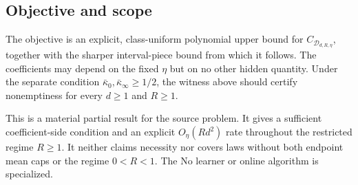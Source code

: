 \subsection{Objective and scope}

The objective is an explicit, class-uniform polynomial upper bound for
$C_{\mathcal D_{d,R,\eta}}$, together with the sharper interval-piece bound
from which it follows.  The coefficients may depend on the fixed $\eta$ but
on no other hidden quantity.  Under the separate condition
$\bar\kappa_0,\bar\kappa_\infty\geq1/2$, the witness above should certify
nonemptiness for every $d\geq1$ and $R\geq1$.

This is a material partial result for the source problem.  It gives a
sufficient coefficient-side condition and an explicit $O_\eta(Rd^2)$ rate
throughout the restricted regime $R\geq1$.  It neither claims necessity nor
covers laws without both endpoint mean caps or the regime $0<R<1$.  The
No learner or online algorithm is specialized.
